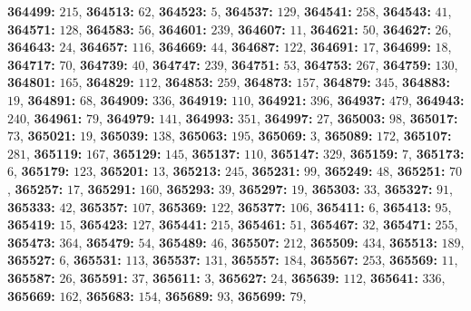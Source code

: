 \textsf{\bfseries 364499:} $215$, \textsf{\bfseries 364513:} $62$, \textsf{\bfseries 364523:} $5$, \textsf{\bfseries 364537:} $129$, \textsf{\bfseries 364541:} $258$, \textsf{\bfseries 364543:} $41$, \textsf{\bfseries 364571:} $128$, \textsf{\bfseries 364583:} $56$, \textsf{\bfseries 364601:} $239$, \textsf{\bfseries 364607:} $11$, \textsf{\bfseries 364621:} $50$, \textsf{\bfseries 364627:} $26$, \textsf{\bfseries 364643:} $24$, \textsf{\bfseries 364657:} $116$, \textsf{\bfseries 364669:} $44$, \textsf{\bfseries 364687:} $122$, \textsf{\bfseries 364691:} $17$, \textsf{\bfseries 364699:} $18$, \textsf{\bfseries 364717:} $70$, \textsf{\bfseries 364739:} $40$, \textsf{\bfseries 364747:} $239$, \textsf{\bfseries 364751:} $53$, \textsf{\bfseries 364753:} $267$, \textsf{\bfseries 364759:} $130$, \textsf{\bfseries 364801:} $165$, \textsf{\bfseries 364829:} $112$, \textsf{\bfseries 364853:} $259$, \textsf{\bfseries 364873:} $157$, \textsf{\bfseries 364879:} $345$, \textsf{\bfseries 364883:} $19$, \textsf{\bfseries 364891:} $68$, \textsf{\bfseries 364909:} $336$, \textsf{\bfseries 364919:} $110$, \textsf{\bfseries 364921:} $396$, \textsf{\bfseries 364937:} $479$, \textsf{\bfseries 364943:} $240$, \textsf{\bfseries 364961:} $79$, \textsf{\bfseries 364979:} $141$, \textsf{\bfseries 364993:} $351$, \textsf{\bfseries 364997:} $27$, \textsf{\bfseries 365003:} $98$, \textsf{\bfseries 365017:} $73$, \textsf{\bfseries 365021:} $19$, \textsf{\bfseries 365039:} $138$, \textsf{\bfseries 365063:} $195$, \textsf{\bfseries 365069:} $3$, \textsf{\bfseries 365089:} $172$, \textsf{\bfseries 365107:} $281$, \textsf{\bfseries 365119:} $167$, \textsf{\bfseries 365129:} $145$, \textsf{\bfseries 365137:} $110$, \textsf{\bfseries 365147:} $329$, \textsf{\bfseries 365159:} $7$, \textsf{\bfseries 365173:} $6$, \textsf{\bfseries 365179:} $123$, \textsf{\bfseries 365201:} $13$, \textsf{\bfseries 365213:} $245$, \textsf{\bfseries 365231:} $99$, \textsf{\bfseries 365249:} $48$, \textsf{\bfseries 365251:} $70$, \textsf{\bfseries 365257:} $17$, \textsf{\bfseries 365291:} $160$, \textsf{\bfseries 365293:} $39$, \textsf{\bfseries 365297:} $19$, \textsf{\bfseries 365303:} $33$, \textsf{\bfseries 365327:} $91$, \textsf{\bfseries 365333:} $42$, \textsf{\bfseries 365357:} $107$, \textsf{\bfseries 365369:} $122$, \textsf{\bfseries 365377:} $106$, \textsf{\bfseries 365411:} $6$, \textsf{\bfseries 365413:} $95$, \textsf{\bfseries 365419:} $15$, \textsf{\bfseries 365423:} $127$, \textsf{\bfseries 365441:} $215$, \textsf{\bfseries 365461:} $51$, \textsf{\bfseries 365467:} $32$, \textsf{\bfseries 365471:} $255$, \textsf{\bfseries 365473:} $364$, \textsf{\bfseries 365479:} $54$, \textsf{\bfseries 365489:} $46$, \textsf{\bfseries 365507:} $212$, \textsf{\bfseries 365509:} $434$, \textsf{\bfseries 365513:} $189$, \textsf{\bfseries 365527:} $6$, \textsf{\bfseries 365531:} $113$, \textsf{\bfseries 365537:} $131$, \textsf{\bfseries 365557:} $184$, \textsf{\bfseries 365567:} $253$, \textsf{\bfseries 365569:} $11$, \textsf{\bfseries 365587:} $26$, \textsf{\bfseries 365591:} $37$, \textsf{\bfseries 365611:} $3$, \textsf{\bfseries 365627:} $24$, \textsf{\bfseries 365639:} $112$, \textsf{\bfseries 365641:} $336$, \textsf{\bfseries 365669:} $162$, \textsf{\bfseries 365683:} $154$, \textsf{\bfseries 365689:} $93$, \textsf{\bfseries 365699:} $79$, 
